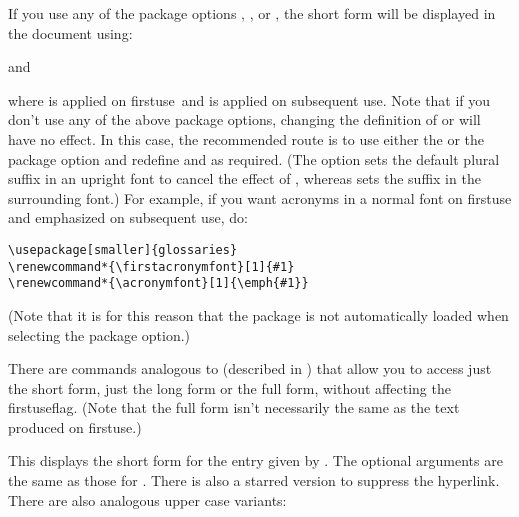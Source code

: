\documentclass{nlctdoc}
\newcommand*{\firstuse}{\gls{firstuse}}
\begin{document}
If you use any of the package options ,
,  or , the
short form  will be displayed in the document using:
\begin{definition}[\DescribeMacro{\acronymfont}]
\end{definition}
and
\begin{definition}[\DescribeMacro{\firstacronymfont}]
\end{definition}
where  is applied on \firstuse\ and
 is applied on subsequent use. Note that if you
don't use any of the above package options, changing the definition
of  or  will have no effect. In
this case, the recommended route is to use either the
 or the  package option and
redefine  and  as required.
(The  option sets the default plural suffix in an
upright font to cancel the effect of , whereas
 sets the suffix in the surrounding font.) For
example, if you want acronyms in a normal font on \gls{firstuse} and
emphasized on subsequent use, do:
\begin{verbatim}
\usepackage[smaller]{glossaries}
\renewcommand*{\firstacronymfont}[1]{#1}
\renewcommand*{\acronymfont}[1]{\emph{#1}}
\end{verbatim}
(Note that it is for this reason that the  package is
not automatically loaded when selecting the  package
option.)

There are commands analogous to  (described in
) that allow you to access just the short
form, just the long form or the full form, without affecting the
\gls{firstuseflag}. (Note that the full form isn't necessarily the same
as the text produced on \firstuse.)

\begin{definition}[\DescribeMacro{\acrshort}]
\end{definition}
This displays the short form for the entry given by .
The optional arguments are the same as those for .
There is also a starred version to suppress the hyperlink. There are
also analogous upper case variants:
\begin{definition}[\DescribeMacro{\Acrshort}]
\end{definition}
\begin{definition}[\DescribeMacro{\ACRshort}]
\end{definition}
\end{document}
